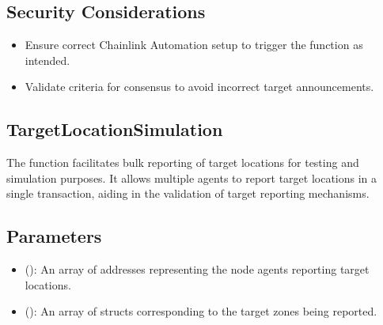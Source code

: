 \documentclass[a4paper,10pt,english]{sphinxmanual}
\begin{document}
\subsection{Security Considerations}
\label{\detokenize{docs_consensus_mechanism_contract:id6}}\begin{itemize}
\item {} 
\sphinxAtStartPar
{} Ensure correct Chainlink Automation setup to trigger the function as intended.

\item {} 
\sphinxAtStartPar
{} Validate criteria for consensus to avoid incorrect target announcements.

\end{itemize}


\subsection{TargetLocationSimulation}
\label{\detokenize{docs_consensus_mechanism_contract:targetlocationsimulation}}
\sphinxAtStartPar
The  function facilitates bulk reporting of target locations for testing and simulation purposes. It allows multiple agents to report target locations in a single transaction, aiding in the validation of target reporting mechanisms.

\begin{sphinxVerbatim}[commandchars=\\\{\}]
\PYG{p}{[}\PYG{p}{]}
\PYG{p}{[}\PYG{p}{]}
\end{sphinxVerbatim}


\subsection{Parameters}
\label{\detokenize{docs_consensus_mechanism_contract:id7}}\begin{itemize}
\item {} 
\sphinxAtStartPar
{} ():
An array of addresses representing the node agents reporting target locations.

\item {} 
\sphinxAtStartPar
{} ():
An array of  structs corresponding to the target zones being reported.

\end{itemize}
\end{document}
